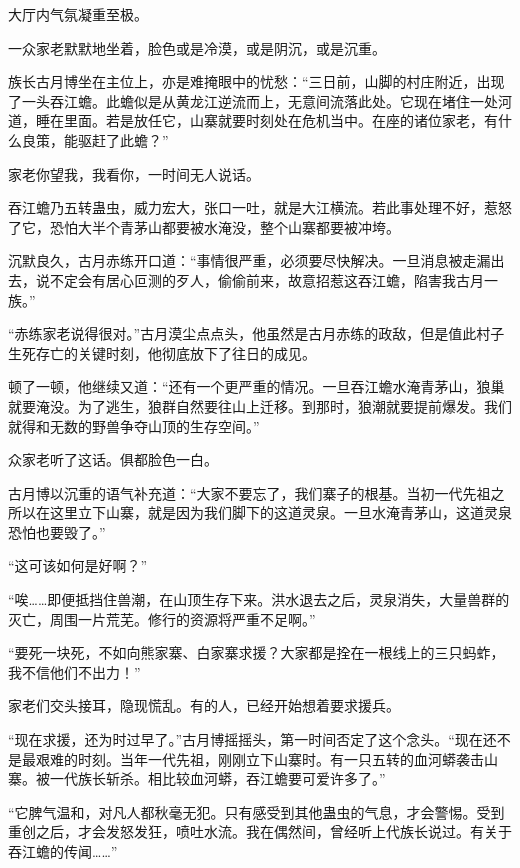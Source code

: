 
\begin{this_body}



大厅内气氛凝重至极。

一众家老默默地坐着，脸色或是冷漠，或是阴沉，或是沉重。

族长古月博坐在主位上，亦是难掩眼中的忧愁：“三日前，山脚的村庄附近，出现了一头吞江蟾。此蟾似是从黄龙江逆流而上，无意间流落此处。它现在堵住一处河道，睡在里面。若是放任它，山寨就要时刻处在危机当中。在座的诸位家老，有什么良策，能驱赶了此蟾？”

家老你望我，我看你，一时间无人说话。

吞江蟾乃五转蛊虫，威力宏大，张口一吐，就是大江横流。若此事处理不好，惹怒了它，恐怕大半个青茅山都要被水淹没，整个山寨都要被冲垮。

沉默良久，古月赤练开口道：“事情很严重，必须要尽快解决。一旦消息被走漏出去，说不定会有居心叵测的歹人，偷偷前来，故意招惹这吞江蟾，陷害我古月一族。”

“赤练家老说得很对。”古月漠尘点点头，他虽然是古月赤练的政敌，但是值此村子生死存亡的关键时刻，他彻底放下了往日的成见。

顿了一顿，他继续又道：“还有一个更严重的情况。一旦吞江蟾水淹青茅山，狼巢就要淹没。为了逃生，狼群自然要往山上迁移。到那时，狼潮就要提前爆发。我们就得和无数的野兽争夺山顶的生存空间。”

众家老听了这话。俱都脸色一白。

古月博以沉重的语气补充道：“大家不要忘了，我们寨子的根基。当初一代先祖之所以在这里立下山寨，就是因为我们脚下的这道灵泉。一旦水淹青茅山，这道灵泉恐怕也要毁了。”

“这可该如何是好啊？”

“唉……即便抵挡住兽潮，在山顶生存下来。洪水退去之后，灵泉消失，大量兽群的灭亡，周围一片荒芜。修行的资源将严重不足啊。”

“要死一块死，不如向熊家寨、白家寨求援？大家都是拴在一根线上的三只蚂蚱，我不信他们不出力！”

家老们交头接耳，隐现慌乱。有的人，已经开始想着要求援兵。

“现在求援，还为时过早了。”古月博摇摇头，第一时间否定了这个念头。“现在还不是最艰难的时刻。当年一代先祖，刚刚立下山寨时。有一只五转的血河蟒袭击山寨。被一代族长斩杀。相比较血河蟒，吞江蟾要可爱许多了。”

“它脾气温和，对凡人都秋毫无犯。只有感受到其他蛊虫的气息，才会警惕。受到重创之后，才会发怒发狂，喷吐水流。我在偶然间，曾经听上代族长说过。有关于吞江蟾的传闻……”


\end{this_body}
